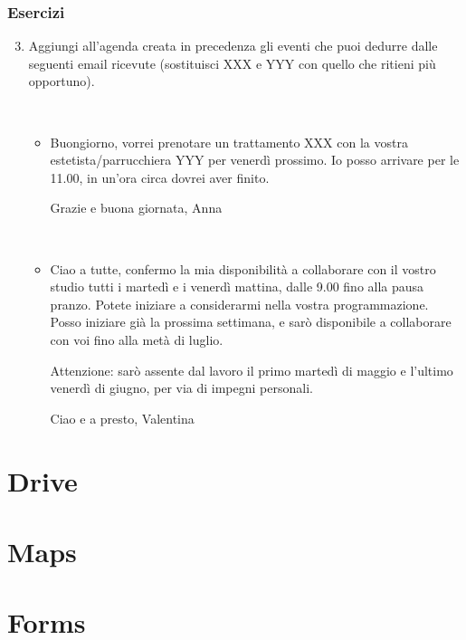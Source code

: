 \documentclass[handout]{beamer}
\begin{document}
\begin{frame}
  \frametitle{Esercizi}
  \begin{enumerate}\setcounter{enumi}{2}
    \item Aggiungi all'agenda creata in precedenza gli eventi che puoi dedurre dalle seguenti email ricevute (sostituisci XXX e YYY con quello che ritieni più opportuno).
    
    ~

    \begin{itemize}
      \item Buongiorno, vorrei prenotare un trattamento XXX con la vostra estetista/parrucchiera YYY per venerdì prossimo. Io posso arrivare per le 11.00, in un'ora circa dovrei aver finito.

      Grazie e buona giornata, Anna

      ~
      \item Ciao a tutte, confermo la mia disponibilità a collaborare con il vostro studio tutti i martedì e i venerdì mattina, dalle 9.00 fino alla pausa pranzo. Potete iniziare a considerarmi nella vostra programmazione. Posso iniziare già la prossima settimana, e sarò disponibile a collaborare con voi fino alla metà di luglio.

      Attenzione: sarò assente dal lavoro il primo martedì di maggio e l'ultimo venerdì di giugno, per via di impegni personali.

      Ciao e a presto, Valentina
    \end{itemize}
  \end{enumerate}
\end{frame}






\section{Drive}

\begin{frame}
\frametitle{}

\end{frame}




\section{Maps}

\begin{frame}
\frametitle{}

\end{frame}


\section{Forms}

\begin{frame}
\frametitle{}

\end{frame}
\end{document}
